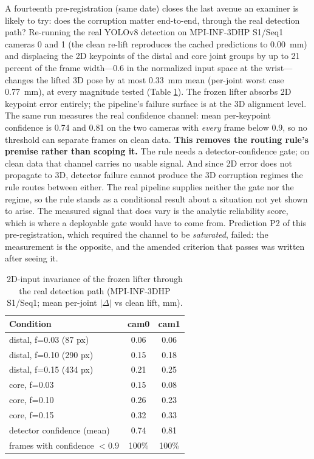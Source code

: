 \documentclass[12pt,a4paper]{report}
\begin{document}
A fourteenth pre-registration (same date) closes the last avenue an examiner is likely to try: does the corruption matter end-to-end, through the real detection path? Re-running the real YOLOv8 detection on MPI-INF-3DHP S1/Seq1 cameras 0 and 1 (the clean re-lift reproduces the cached predictions to 0.00~mm) and displacing the 2D keypoints of the distal and core joint groups by up to 21 percent of the frame width---0.6 in the normalized input space at the wrist---changes the lifted 3D pose by at most 0.33~mm mean (per-joint worst case 0.77~mm), at every magnitude tested (Table \ref{tab:misdetect}). The frozen lifter absorbs 2D keypoint error entirely; the pipeline's failure surface is at the 3D alignment level. The same run measures the real confidence channel: mean per-keypoint confidence is 0.74 and 0.81 on the two cameras with \emph{every} frame below 0.9, so no threshold can separate frames on clean data. \textbf{This removes the routing rule's premise rather than scoping it.} The rule needs a detector-confidence gate; on clean data that channel carries no usable signal. And since 2D error does not propagate to 3D, detector failure cannot produce the 3D corruption regimes the rule routes between either. The real pipeline supplies neither the gate nor the regime, so the rule stands as a conditional result about a situation not yet shown to arise. The measured signal that does vary is the analytic reliability score, which is where a deployable gate would have to come from. Prediction P2 of this pre-registration, which required the channel to be \emph{saturated}, failed: the measurement is the opposite, and the amended criterion that passes was written after seeing it.

\begin{table}[H]
\centering
\caption[2D-input invariance of the frozen lifter]{2D-input invariance of the frozen lifter through the real detection path (MPI-INF-3DHP S1/Seq1; mean per-joint $|\Delta|$ vs clean lift, mm).}
\label{tab:misdetect}
\begin{tabular}{lcc}
\toprule
Condition & cam0 & cam1 \\
\midrule
distal, f=0.03 (87 px) & 0.06 & 0.06 \\
distal, f=0.10 (290 px) & 0.15 & 0.18 \\
distal, f=0.15 (434 px) & 0.21 & 0.25 \\
core, f=0.03 & 0.15 & 0.08 \\
core, f=0.10 & 0.26 & 0.23 \\
core, f=0.15 & 0.32 & 0.33 \\
\midrule
detector confidence (mean) & 0.74 & 0.81 \\
frames with confidence $< 0.9$ & 100\% & 100\% \\
\bottomrule
\end{tabular}
\end{table}
\end{document}

